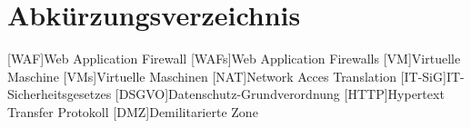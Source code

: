 \tableofcontents
\pagebreak

\section{Abkürzungsverzeichnis}

\begin{acronym}
    [WAF]{Web Application Firewall}
    [WAFs]{Web Application Firewalls}
    [VM]{Virtuelle Maschine}
    [VMs]{Virtuelle Maschinen}
    [NAT]{Network Acces Translation}
    [IT-SiG]{IT-Sicherheitsgesetzes}
    [DSGVO]{Datenschutz-Grundverordnung}
    [HTTP]{Hypertext Transfer Protokoll}
    [DMZ]{Demilitarierte Zone}
\end{acronym}

\pagebreak

\listoffigures

\pagebreak